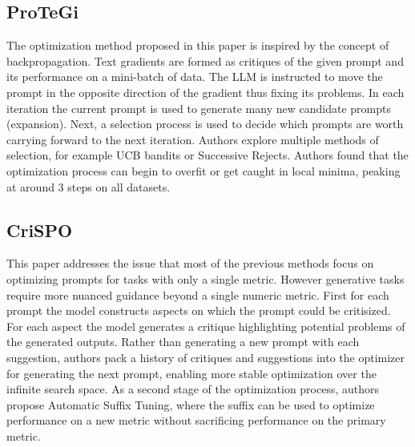 \subsection{ProTeGi \cite{pryzant2023automaticpromptoptimizationgradient}}
The optimization method proposed in this paper is inspired by the concept of backpropagation. Text gradients are formed as critiques of the given prompt and its performance on a mini-batch of data.
The LLM is instructed to move the prompt in the opposite direction of the gradient thus fixing its problems. In each iteration the current prompt is used to generate many new candidate prompts (expansion). 
Next, a selection process is used to decide which prompts are worth carrying forward to the next iteration. Authors explore multiple methods of selection, for example UCB bandits or Successive Rejects.
Authors found that the optimization process can begin to overfit or get caught in local minima, peaking at around 3 steps on all datasets.
\subsection{CriSPO \cite{he2024crispomultiaspectcritiquesuggestionguidedautomatic}}
This paper addresses the issue that most of the previous methods focus on optimizing prompts for tasks with only a single metric. However generative tasks require more nuanced guidance beyond a single numeric metric.
First for each prompt the model constructs aspects on which the prompt could be critisized. For each aspect the model generates a critique highlighting potential problems of the generated outputs. 
Rather than generating a new prompt with each suggestion, authors pack a history of critiques and suggestions into the optimizer for generating the next prompt, enabling more stable optimization over the infinite search space.
As a second stage of the optimization process, authors propose Automatic Suffix Tuning, where the suffix can be used to optimize performance on a new metric without sacrificing performance on the primary metric.
